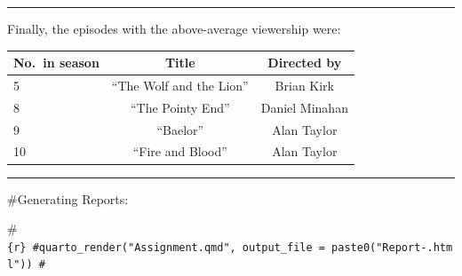 \documentclass[
  letterpaper,
  DIV=11,
  numbers=noendperiod]{scrartcl}
\begin{document}
\begin{center}\rule{0.5\linewidth}{0.5pt}\end{center}

Finally, the episodes with the above-average viewership were:

\begin{longtable}[]{@{}lcc@{}}
\toprule()
No.~in season & Title & Directed by \\
\midrule()
\endhead
5 & ``The Wolf and the Lion'' & Brian Kirk \\
8 & ``The Pointy End'' & Daniel Minahan \\
9 & ``Baelor'' & Alan Taylor \\
10 & ``Fire and Blood'' & Alan Taylor \\
\bottomrule()
\end{longtable}

\begin{center}\rule{0.5\linewidth}{0.5pt}\end{center}

\#Generating Reports:

\#\texttt{\{r\}\ \#quarto\_render("Assignment.qmd",\ output\_file\ =\ paste0("Report-.html"))\ \#}
\end{document}
